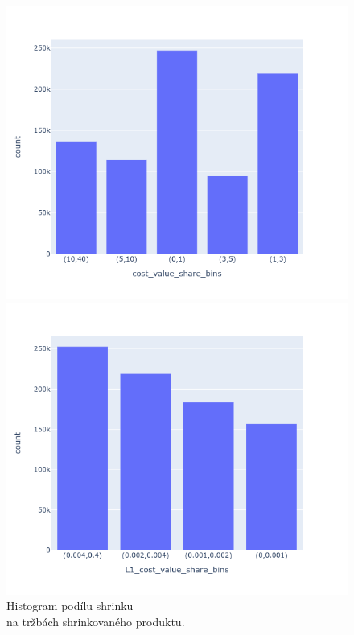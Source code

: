 \begin{figure}[h!]
    \centering
    \begin{minipage}[b]{.55\textwidth}
      \centering
      \captionsetup{justification=centering}

      \includegraphics[width=\textwidth]{obrazky/grafy/histogram/newplot.png}
      \vspace*{-3em}
      \caption{Histogram podílu shrinku \\na tržbách shrinkovaného produktu.}
      \label{obr:nb:hist3}
    \end{minipage}%
    \hspace*{-2em}
    \begin{minipage}[b]{.55\textwidth}
        \centering
        \captionsetup{justification=centering}
        \includegraphics[width=\textwidth]{obrazky/grafy/histogram/newplot(3).png}

\end{minipage}
\end{figure}
